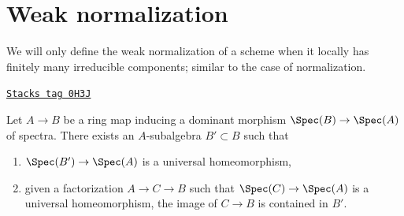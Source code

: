 \section{Weak normalization}
\label{morphisms-section-weak-normalization}
We will only define the weak normalization of a scheme when
it locally has finitely many irreducible components; similar
to the case of normalization.

\begin{lemma}
\label{morphisms-lemma-relative-weak-normalization-algebra}
\href{https://stacks.math.columbia.edu/tag/0H3J}{\texttt{Stacks tag 0H3J}}

Let $A \to B$ be a ring map inducing a dominant morphism
$\Spec(B) \to \Spec(A)$ of spectra. There exists an $A$-subalgebra
$B' \subset B$ such that
\begin{enumerate}
\item $\Spec(B') \to \Spec(A)$ is a universal homeomorphism,
\item given a factorization $A \to C \to B$ such that
$\Spec(C) \to \Spec(A)$ is a universal homeomorphism, the
image of $C \to B$ is contained in $B'$.
\end{enumerate}
\end{lemma}

